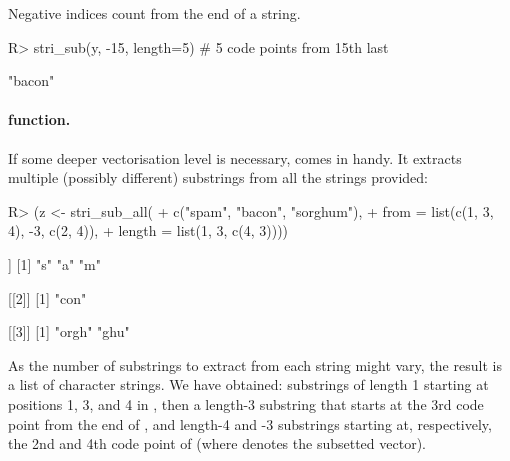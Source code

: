 \documentclass[nojss]{jss}
\begin{document}
Negative indices count from the end of a string.

\begin{Schunk}
\begin{Sinput}
R> stri_sub(y, -15, length=5)  # 5 code points from 15th last
\end{Sinput}
\begin{Soutput}
[1] "bacon"
\end{Soutput}
\end{Schunk}




\paragraph{ function.}
%
If some deeper vectorisation level is necessary, 
comes in handy. It extracts multiple (possibly different) substrings
from all the strings provided:


\begin{Schunk}
\begin{Sinput}
R> (z <- stri_sub_all(
+                c("spam",     "bacon", "sorghum"),
+    from   = list(c(1, 3, 4), -3,      c(2, 4)),
+    length = list(1,           3,      c(4, 3))))
\end{Sinput}
\begin{Soutput}
[[1]]
[1] "s" "a" "m"

[[2]]
[1] "con"

[[3]]
[1] "orgh" "ghu"
\end{Soutput}
\end{Schunk}

As the number of substrings to extract from each string might vary,
the result is a list of character strings.
We have obtained:
substrings of length 1 starting at positions 1, 3, and 4 in ,
then a length-3 substring that starts at the 3rd code point
from the end of ,
and length-4 and -3 substrings starting at, respectively,
the 2nd and 4th code point
of  (where  denotes the subsetted vector).
\end{document}
